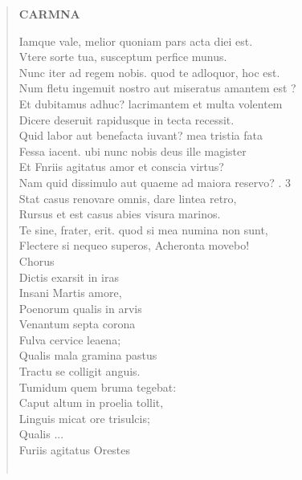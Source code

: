 \documentclass[11pt, a4paper]{report}
\begin{document}
\begin{verse}
    \begin{center} \textbf{CARMNA} \end{center}Iamque vale, melior quoniam pars acta diei est. \\ Vtere sorte tua, susceptum perfice munus. \\ Nunc iter ad regem nobis. quod te adloquor, hoc est. \\ Num fletu ingemuit nostro aut miseratus amantem  \lbrack est \rbrack  ? \\ Et dubitamus adhuc? lacrimantem et multa volentem \\ Dicere deseruit rapidusque in tecta recessit. \\ Quid labor aut benefacta iuvant? mea tristia fata \\ Fessa iacent. ubi nunc nobis deus ille magister \\ Et Fnriis agitatus amor et conscia virtus? \\ Nam quid dissimulo aut quaeme ad maiora reservo? . 3 \\ Stat casus renovare omnis, dare lintea retro, \\ Rursus et  \lbrack est \rbrack  casus abies visura marinos. \\ Te sine, frater, erit. quod si mea numina non sunt, \\ Flectere si nequeo superos, Acheronta movebo! \\ Chorus \\ Dictis exarsit in iras \\ Insani Martis amore, \\ Poenorum qualis in arvis \\ Venantum septa corona \\ Fulva cervice leaena; \\ Qualis mala gramina pastus \\ Tractu se colligit anguis. \\ Tumidum quem bruma tegebat: \\ Caput altum in proelia tollit, \\ Linguis micat ore trisulcis; \\  \lbrack Qualis  \lbrack ... \rbrack  \\ Furiis agitatus Orestes \\ 
        ﻿\pagebreak 

\end{verse}
\end{document}
